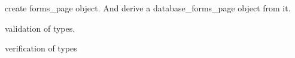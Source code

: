 \begin{DoxyRefList}
create forms\-\_\-page object. And derive a database\-\_\-forms\-\_\-page object from it. 
\item[\label{todo__todo000015}%
\hypertarget{todo__todo000015}{}%
Member \hyperlink{classpage_aeab45580b69b8dc485402dd01694303d}{page\-:\-:set\-\_\-content} (\$c)]validation of types.  
\item[\label{todo__todo000016}%
\hypertarget{todo__todo000016}{}%
Member \hyperlink{classpage_ab0afa0eb524cf4c4cb00aafab2912564}{page\-:\-:set\-\_\-google\-\_\-analytics} (\$gac)]verification of types 
\end{DoxyRefList}